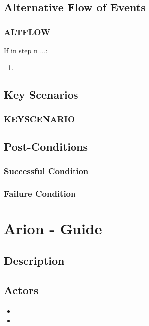 \documentclass{scrreprt}
\begin{document}
\section{Alternative Flow of Events}

    \subsection{ALTFLOW}
    If in step n ...:
    \begin{enumerate}
        \item 
    \end{enumerate}

\section{Key Scenarios}
    \subsection{KEYSCENARIO}

\section{Post-Conditions}
    \subsection{Successful Condition}
    
    \subsection{Failure Condition}


\chapter{Arion - Guide}

\section{Description}

\section{Actors}
\begin{itemize}
    \item 
    \item 
\end{itemize}
\end{document}
